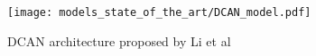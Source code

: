 \begin{figure}[H]
  \centering
  \texttt{[image: models\_state\_of\_the\_art/DCAN\_model.pdf]}
  \caption{DCAN architecture proposed by Li et al \cite{li2020}}
  \label{fig:DCAN_model}
\end{figure}




\begin{comment}

\subsection{Wasserstein Distance Guided Multi-Adversarial Network}
Zhang et al \cite{Zhang2019} present a Wasserstein distance guided multi-adversarial network (WDMAN) for rolling bearing fault diagnosis under different working conditions. The proposed architecture consists of a CNN feature mapper and a subsequent classifier. In the fully connected layers of the classifier, several Domain Critic Networks estimate the domain discrepancy by applying the Wasserstein-distance. A source CE-loss is applied in the end of the network. The whole model and the applied losses are visualized in fig. \ref{fig:WDMAN_model}.

 \begin{figure}[H]
  \centering
  \texttt{[image: models\_state\_of\_the\_art/WDMAN\_model.pdf]}
  \caption{WDMAN architecture proposed by Zhang et al \cite{Zhang2019}}
  \label{fig:WDMAN_model}
\end{figure}

In a pre-training phase, the feature mapper $\theta_{M}$ and classifier $\theta_{C}$ are optimized with the source CE-loss:
 
\begin{equation}
     L_{c}(x^{s}, x^{t}) = -\frac{1}{n^{s}} \sum_{i=1}^{n^{s}} \sum_{k=1}^{K} l(y_{i}^{s}=k) \cdot logC(M(x_{i}^{s}))_{k},
\end{equation}

where $n^{s}$ is the number of source samples, $K$ is the number of classes, $x_{i}^{s}$ and $y_{i}^{s}$ are the source samples and corresponding labels, $M(\cdot)$ and $C(\cdot)$ are the feature mapper and classifier. In the adversarial training afterwards, the model learns to extract more domain invariant features by minimizing the Wasserstein distance in the fully connected layers of the classifier. The domain critic networks try to maximize and the feature mapper to minimize the adversarial loss. The adversarial training transfers the model, trained on the source domain, to the target domain:
 

\end{comment}
